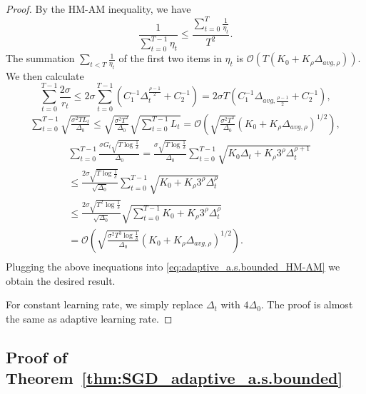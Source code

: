 \documentclass{article}
\newcommand{\Kr}{K_{\rho}}
\newcommand{\paren}[1]{\left( #1 \right)}
\begin{document}
\begin{proof}
    By the HM-AM inequality, we have
    \begin{equation}\label{eq:adaptive_a.s.bounded_HM-AM}
        \frac{1}{\sum_{t=0}^{T-1}\eta_t}\leq \frac{\sum_{t=0}^T \frac{1}{\eta_t}}{T^2}.
    \end{equation}
    The summation $\sum_{t<T}\frac{1}{\eta_t}$ of the first two items in $\eta_t$ is $\mathcal{O}\paren{T\paren{K_0+\Kr\Delta_{avg,\rho}}}$. We then calculate
    $$\sum_{t=0}^{T-1}\frac{2\sigma}{r_t}\leq 2\sigma\sum_{t=0}^{T-1}\paren{C_1^{-1}\Delta_t^{\frac{\rho-1}{2}}+C_2^{-1}}=2\sigma T\paren{C_1^{-1}\Delta_{avg,\frac{\rho-1}{2}}+C_2^{-1}},$$
    \begin{align*}
        \sum_{t=0}^{T-1}\sqrt{\frac{\sigma^2TL_t}{\Delta_0}}\leq \sqrt{\frac{\sigma^2 T^2}{\Delta_0}}\sqrt{\sum_{t=0}^{T-1}L_t}=\mathcal{O}\paren{\sqrt{\frac{\sigma^2 T^3}{\Delta_0}}\paren{K_0+\Kr\Delta_{avg,\rho}}^{1/2}},
    \end{align*}
    \begin{align*}
        &\sum_{t=0}^{T-1}\frac{\sigma G_t\sqrt{T\log\frac{1}{\delta}}}{\Delta_0}=\frac{\sigma\sqrt{T\log\frac{1}{\delta}}}{\Delta_0}\sum_{t=0}^{T-1} \sqrt{K_0\Delta_t+\Kr3^\rho\Delta_t^{\rho+1}}\\
        &\leq \frac{2\sigma\sqrt{T\log\frac{1}{\delta}}}{\sqrt{\Delta_0}}\sum_{t=0}^{T-1}\sqrt{K_0+\Kr3^\rho\Delta_t^{\rho}}\\
        &\leq \frac{2\sigma\sqrt{T^2\log\frac{1}{\delta}}}{\sqrt{\Delta_0}}\sqrt{\sum_{t=0}^{T-1}K_0+\Kr3^\rho\Delta_t^{\rho}}\\
        &=\mathcal{O}\paren{\sqrt{\frac{\sigma^2T^3\log\frac{1}{\delta}}{\Delta_0}}\paren{K_0+\Kr\Delta_{avg,\rho}}^{1/2}}.\\
    \end{align*}
    Plugging the above inequations into \eqref{eq:adaptive_a.s.bounded_HM-AM} we obtain the desired result.

    For constant learning rate, we simply replace $\Delta_t$ with $4\Delta_0$. 
    The proof is almost the same as adaptive learning rate.
\end{proof}


\subsection{Proof of Theorem~\ref{thm:SGD_adaptive_a.s.bounded}}\label{apx:proof_thm_a.s.bounded_adaptive}
\end{document}
